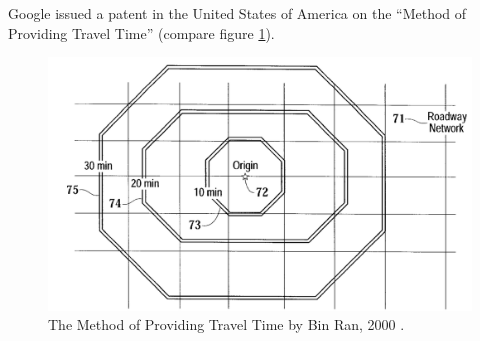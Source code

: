     Google issued a patent in the United States of America on the
    \enquote{Method of Providing Travel Time} (compare figure
    \ref{fig:overv:patnt}).\par

    \begin{figure}[htb]
      \centering
      \includegraphics[width=\linewidth]
        {./img/overv-patnt.png}
      \caption{The Method of Providing Travel Time by Bin Ran, 2000 \cite{ran2001method}.}
      \label{fig:overv:patnt}
    \end{figure}















